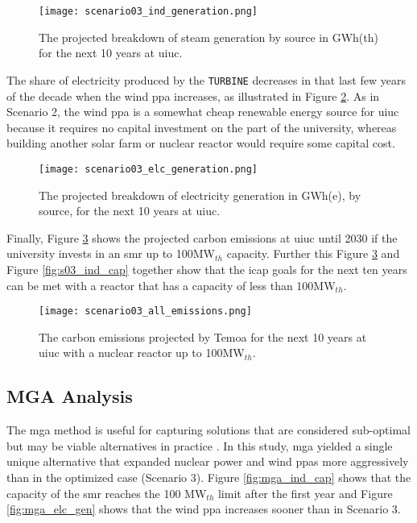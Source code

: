 \begin{figure}[ht!]
	\centering
	\texttt{[image: scenario03\_ind\_generation.png]}
	\caption{The projected breakdown of steam generation by source in GWh(th)
	for the next 10 years at \gls{uiuc}.}
	\label{fig:s03_ind_gen}
\end{figure}
The share of electricity produced by the \texttt{TURBINE} decreases in
that last few years of the decade when the wind \gls{ppa} increases, as
illustrated in Figure \ref{fig:s03_elc_gen}. As in Scenario 2, the wind
\gls{ppa} is a somewhat cheap renewable energy source for \gls{uiuc} because
it requires no capital investment on the part of the university, whereas
building another solar farm or nuclear reactor would require some capital cost.

\begin{figure}[ht!]
	\centering
	\texttt{[image: scenario03\_elc\_generation.png]}
	\caption{The projected breakdown of electricity generation in GWh(e), by
	source, for the next 10 years at \gls{uiuc}.}
	\label{fig:s03_elc_gen}
\end{figure}

Finally, Figure \ref{fig:s03_all_co2} shows the projected carbon emissions at
\gls{uiuc} until 2030 if the university invests in an \gls{smr} up to
100MW$_{th}$ capacity. Further this Figure \ref{fig:s03_all_co2} and Figure
\ref{fig:s03_ind_cap} together show that the \gls{icap} goals for the next ten
years can be met with a reactor that has a capacity of less than 100MW$_{th}$.

\begin{figure}[ht!]
	\centering
	\texttt{[image: scenario03\_all\_emissions.png]}
	\caption{The carbon emissions projected by Temoa for the next 10 years at
	\gls{uiuc} with a nuclear reactor up to 100MW$_{th}$.}
	\label{fig:s03_all_co2}
\end{figure}

\subsection{MGA Analysis}

The \gls{mga} method is useful for capturing solutions that are
considered sub-optimal but may be viable alternatives in practice
\cite{decarolis_modelling_2016, hunter_modeling_2013,decarolis_using_2011}.
In this study, \gls{mga} yielded a single unique alternative that expanded
nuclear power and wind \glspl{ppa} more aggressively than in the optimized case
(Scenario 3). Figure \ref{fig:mga_ind_cap} shows that the capacity of the
\gls{smr} reaches the 100 MW$_{th}$ limit after the first year and Figure
\ref{fig:mga_elc_gen} shows that the wind \gls{ppa} increases sooner than in
Scenario 3.

